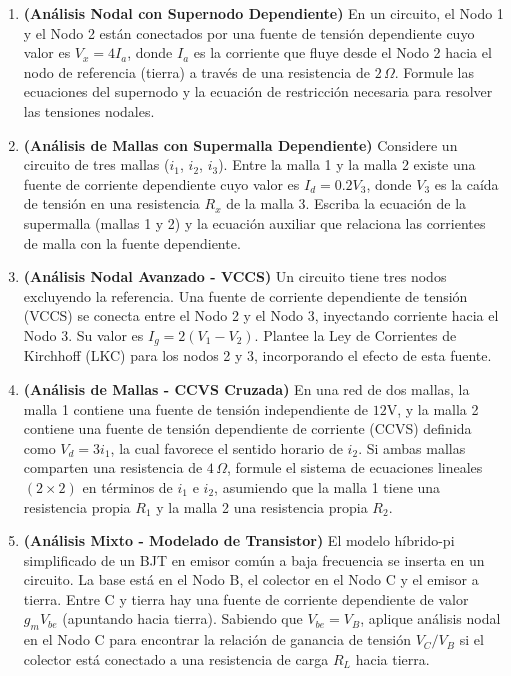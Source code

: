 \documentclass[12pt, a4paper]{article}
\begin{document}
\begin{enumerate}[leftmargin=*, itemsep=1.5em]
    \item \textbf{(Análisis Nodal con Supernodo Dependiente)} En un circuito, el Nodo 1 y el Nodo 2 están conectados por una fuente de tensión dependiente cuyo valor es $V_x = 4 I_a$, donde $I_a$ es la corriente que fluye desde el Nodo 2 hacia el nodo de referencia (tierra) a través de una resistencia de $2\,\Omega$. Formule las ecuaciones del supernodo y la ecuación de restricción necesaria para resolver las tensiones nodales.

    \item \textbf{(Análisis de Mallas con Supermalla Dependiente)} Considere un circuito de tres mallas ($i_1$, $i_2$, $i_3$). Entre la malla 1 y la malla 2 existe una fuente de corriente dependiente cuyo valor es $I_d = 0.2 V_3$, donde $V_3$ es la caída de tensión en una resistencia $R_x$ de la malla 3. Escriba la ecuación de la supermalla (mallas 1 y 2) y la ecuación auxiliar que relaciona las corrientes de malla con la fuente dependiente.

    \item \textbf{(Análisis Nodal Avanzado - VCCS)} Un circuito tiene tres nodos excluyendo la referencia. Una fuente de corriente dependiente de tensión (VCCS) se conecta entre el Nodo 2 y el Nodo 3, inyectando corriente hacia el Nodo 3. Su valor es $I_g = 2 (V_1 - V_2)$. Plantee la Ley de Corrientes de Kirchhoff (LKC) para los nodos 2 y 3, incorporando el efecto de esta fuente.

    \item \textbf{(Análisis de Mallas - CCVS Cruzada)} En una red de dos mallas, la malla 1 contiene una fuente de tensión independiente de $12\text{V}$, y la malla 2 contiene una fuente de tensión dependiente de corriente (CCVS) definida como $V_d = 3 i_1$, la cual favorece el sentido horario de $i_2$. Si ambas mallas comparten una resistencia de $4\,\Omega$, formule el sistema de ecuaciones lineales $(2 \times 2)$ en términos de $i_1$ e $i_2$, asumiendo que la malla 1 tiene una resistencia propia $R_1$ y la malla 2 una resistencia propia $R_2$.

    \item \textbf{(Análisis Mixto - Modelado de Transistor)} El modelo híbrido-pi simplificado de un BJT en emisor común a baja frecuencia se inserta en un circuito. La base está en el Nodo B, el colector en el Nodo C y el emisor a tierra. Entre C y tierra hay una fuente de corriente dependiente de valor $g_m V_{be}$ (apuntando hacia tierra). Sabiendo que $V_{be} = V_B$, aplique análisis nodal en el Nodo C para encontrar la relación de ganancia de tensión $V_C / V_B$ si el colector está conectado a una resistencia de carga $R_L$ hacia tierra.

\end{enumerate}
\end{document}
